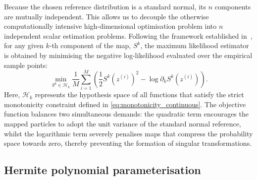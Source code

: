 Because the chosen reference distribution is a standard normal, its $n$ components are mutually independent. This allows us to decouple the otherwise computationally intensive high-dimensional optimisation problem into $n$ independent scalar estimation problems. Following the framework established in~\cite{Baptista2022}, for any given $k$-th component of the map, $S^k$, the maximum likelihood estimator is obtained by minimising the negative log-likelihood evaluated over the empirical sample points:
\begin{equation}
    \min_{S^k \in \mathcal{H}_k} \frac{1}{M} \sum_{i=1}^M \left( \frac{1}{2} S^k(z^{(i)})^2 - \log \partial_k S^k(z^{(i)}) \right).
    \label{eq:mle_objective}
\end{equation}
Here, $\mathcal{H}_k$ represents the hypothesis space of all functions that satisfy the strict monotonicity constraint defined in \eqref{eq:monotonicity_continuous}. The objective function balances two simultaneous demands: the quadratic term encourages the mapped particles to adopt the unit variance of the standard normal reference, whilst the logarithmic term severely penalises maps that compress the probability space towards zero, thereby preventing the formation of singular transformations.

\subsection{Hermite polynomial parameterisation}

